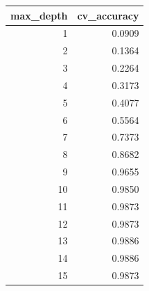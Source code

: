 \begin{tabular}{rr}
\toprule
max_depth & cv_accuracy \\
\midrule
1 & 0.0909 \\
2 & 0.1364 \\
3 & 0.2264 \\
4 & 0.3173 \\
5 & 0.4077 \\
6 & 0.5564 \\
7 & 0.7373 \\
8 & 0.8682 \\
9 & 0.9655 \\
10 & 0.9850 \\
11 & 0.9873 \\
12 & 0.9873 \\
13 & 0.9886 \\
14 & 0.9886 \\
15 & 0.9873 \\
\bottomrule
\end{tabular}
